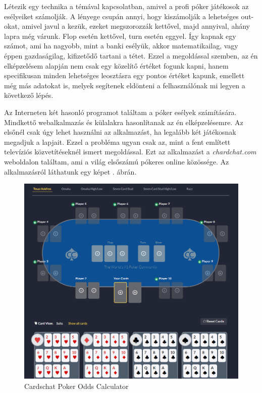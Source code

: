 Létezik egy technika a témával kapcsolatban, amivel a profi póker játékosok az esélyeiket számolják. A lényege csupán annyi, hogy kiszámolják a lehetséges out-okat, amivel javul a kezük, ezeket megszorozzák kettővel, majd annyival, ahány lapra még várunk. Flop esetén kettővel, turn esetén eggyel. Így kapnak egy számot, ami ha nagyobb, mint a banki esélyük, akkor matematikailag, vagy éppen gazdaságilag, kifizetődő tartani a tétet. Ezzel a megoldással szemben, az én elképzelésem alapján nem csak egy közelítő értéket fogunk kapni, hanem specifikusan minden lehetséges leosztásra egy pontos értéket kapunk, emellett még más adatokat is, melyek segítenek eldönteni a felhasználónak mi legyen a következő lépés.

Az Interneten két hasonló programot találtam a póker esélyek számítására. Mindkettő webalkalmazás és külalakra hasonlítanak az én elképzelésemre. Az elsőnél csak úgy lehet használni az alkalmazást, ha legalább két játékosnak megadjuk a lapjait. Ezzel a probléma ugyan csak az, mint a fent említett televíziós közvetítéseknél ismert megoldással. Ezt az alkalmazást a \textit{chardchat.com} weboldalon találtam, ami a világ elsőszámú pókeres online közössége. Az alkalmazásról láthatunk egy képet . ábrán.

\begin{figure}[h!]
	\centering
	\includegraphics[width=\textwidth]{images/cardschat.png}
	\caption{Cardschat Poker Odds Calculator \cite{cardschat}}
	\label{fig:cardschat}
\end{figure}

